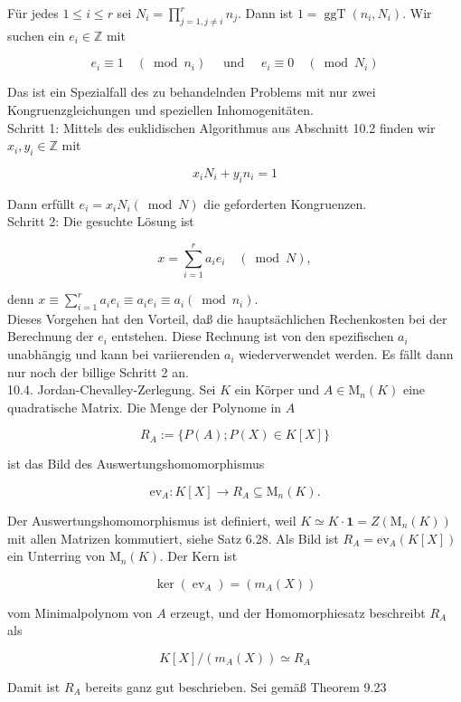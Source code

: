 \documentclass[10pt, letterpaper]{article}
\begin{document}
Für jedes $1 \leq i \leq r$ sei $N_{i}=\prod_{j=1, j \neq i}^{r} n_{j}$. Dann ist $1=\operatorname{ggT}\left(n_{i}, N_{i}\right)$. Wir suchen ein $e_{i} \in \mathbb{Z}$ mit

$$
e_{i} \equiv 1 \quad\left(\bmod n_{i}\right) \quad \text { und } \quad e_{i} \equiv 0 \quad\left(\bmod N_{i}\right)
$$

Das ist ein Spezialfall des zu behandelnden Problems mit nur zwei Kongruenzgleichungen und speziellen Inhomogenitäten.\\
Schritt 1: Mittels des euklidischen Algorithmus aus Abschnitt 10.2 finden wir $x_{i}, y_{i} \in \mathbb{Z}$ mit

$$
x_{i} N_{i}+y_{i} n_{i}=1
$$

Dann erfüllt $e_{i}=x_{i} N_{i}(\bmod N)$ die geforderten Kongruenzen.\\
Schritt 2: Die gesuchte Lösung ist

$$
x=\sum_{i=1}^{r} a_{i} e_{i} \quad(\bmod N),
$$

denn $x \equiv \sum_{i=1}^{r} a_{i} e_{i} \equiv a_{i} e_{i} \equiv a_{i}\left(\bmod n_{i}\right)$.\\
Dieses Vorgehen hat den Vorteil, daß die hauptsächlichen Rechenkosten bei der Berechnung der $e_{i}$ entstehen. Diese Rechnung ist von den spezifischen $a_{i}$ unabhängig und kann bei variierenden $a_{i}$ wiederverwendet werden. Es fällt dann nur noch der billige Schritt 2 an.\\
10.4. Jordan-Chevalley-Zerlegung. Sei $K$ ein Körper und $A \in \mathrm{M}_{n}(K)$ eine quadratische Matrix. Die Menge der Polynome in $A$

$$
R_{A}:=\{P(A) ; P(X) \in K[X]\}
$$

ist das Bild des Auswertungshomomorphismus

$$
\mathrm{ev}_{A}: K[X] \rightarrow R_{A} \subseteq \mathrm{M}_{n}(K) .
$$

Der Auswertungshomomorphismus ist definiert, weil $K \simeq K \cdot \mathbf{1}=Z\left(\mathrm{M}_{n}(K)\right)$ mit allen Matrizen kommutiert, siehe Satz 6.28. Als Bild ist $R_{A}=\mathrm{ev}_{A}(K[X])$ ein Unterring von $\mathrm{M}_{n}(K)$. Der Kern ist

$$
\operatorname{ker}\left(\operatorname{ev}_{A}\right)=\left(m_{A}(X)\right)
$$

vom Minimalpolynom von $A$ erzeugt, und der Homomorphiesatz beschreibt $R_{A}$ als

$$
K[X] /\left(m_{A}(X)\right) \simeq R_{A}
$$

Damit ist $R_{A}$ bereits ganz gut beschrieben. Sei gemäß Theorem 9.23
\end{document}
